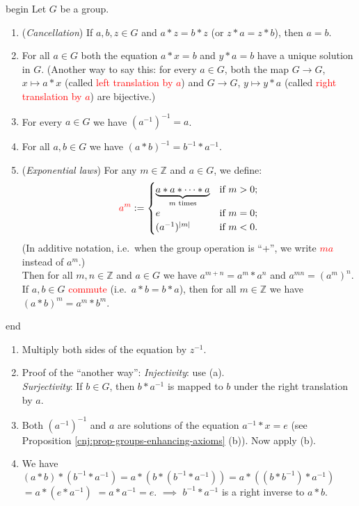 \documentclass[
  12pt,
  a4paper,
  twoside]{article}
\theoremstyle{plain}
\theoremstyle{definition}
\begin{document}
\csname begin\label{cnj:prop-more-group-props}
Let \(G\) be a group.

\begin{enumerate}
\def\labelenumi{(\alph{enumi})}
\item
  (\emph{Cancellation}) If \(a,b,z\in G\) and \(a*z=b*z\) (or \(z*a=z*b\)), then \(a=b\).
\item
  For all \(a\in G\) both the equation \(a*x=b\) and \(y*a=b\) have a unique solution in \(G\). (Another way to say this: for every \(a\in G\), both the map \(G\to G\), \(x\mapsto a*x\) (called \textcolor{red}{left translation by $a$}) and \(G\to G\), \(y\mapsto y*a\) (called \textcolor{red}{right translation by $a$}) are bijective.)
\item
  For every \(a\in G\) we have \((a^{-1})^{-1}=a\).
\item
  For all \(a,b\in G\) we have \((a*b)^{-1}=b^{-1}*a^{-1}\).
\item
  (\emph{Exponential laws}) For any \(m\in \mathbb{Z}\) and \(a\in G\), we define:
  \[
  {\color{red}{a^m}} :=
  \begin{cases}
  \underbrace{a*a*\cdots*a}_{m\text{ times}} & \text{if }m>0;\\
  e & \text{if }m=0;\\
  (a^{-1})^{|m|} & \text{if }m<0.
  \end{cases}
  \]
  (In additive notation, i.e.~when the group operation is ``+'', we write \textcolor{red}{$ma$} instead of \(a^m\).)\\
  Then for all \(m,n\in\mathbb{Z}\) and \(a\in G\) we have \(a^{m+n}=a^m * a^n\) and \(a^{mn}=(a^m)^n\).\\
  If \(a,b\in G\) \textcolor{red}{commute} (i.e.~\(a*b=b*a\)), then for all \(m\in\mathbb{Z}\) we have \((a*b)^m = a^m*b^m\).
\end{enumerate}

\csname end

\begin{enumerate}
\def\labelenumi{(\alph{enumi})}
\item
  Multiply both sides of the equation by \(z^{-1}\).
\item
  Proof of the ``another way'': \emph{Injectivity}: use (a).\\
  \emph{Surjectivity}: If \(b\in G\), then \(b*a^{-1}\) is mapped to \(b\) under the right translation by \(a\).
\item
  Both \((a^{-1})^{-1}\) and \(a\) are solutions of the equation \(a^{-1}*x=e\) (see Proposition \ref{cnj:prop-groups-enhancing-axioms} (b)). Now apply (b).
\item
  We have \((a*b)*(b^{-1}*a^{-1}) = a*(b*(b^{-1}*a^{-1})) = a*((b*b^{-1})*a^{-1})\) \(= a*(e*a^{-1})\) \(=a*a^{-1} = e\). \(\implies\) \(b^{-1}*a^{-1}\) is a right inverse to \(a*b\).
\end{enumerate}
\end{document}
